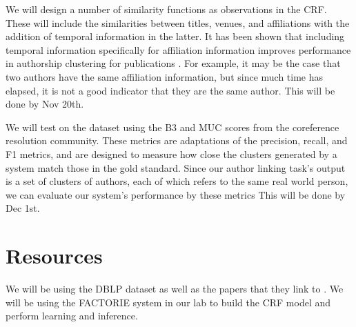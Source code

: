 \documentclass[]{article}
\begin{document}
We will design a number of similarity functions as observations in the CRF. These will include the similarities between titles, venues, and affiliations with the addition of temporal information in the latter. It has been shown that including temporal information specifically for affiliation information improves performance in authorship clustering for publications \cite{DBLP:journals/fcsc/LiDMS12}. For example, it may be the case that two authors have the same affiliation information, but since much time has elapsed, it is not a good indicator that they are the same author.
This will be done by Nov 20th.

We will test on the dataset using the B3 \cite{Bagga98algorithms} and MUC\cite{Vilain95} scores from the coreference resolution community.  These metrics are adaptations of the precision, recall, and F1 metrics, and are designed to measure how close the clusters generated by a system match those in the gold standard.  Since our author linking task's output is a set of clusters of authors, each of which refers to the same real world person, we can evaluate our system's performance by these metrics
This will be done by Dec 1st.

\section{Resources} %
\label{sec:resources}
We will be using the DBLP dataset as well as the papers that they link to \cite{ley2002dblp}. We will be using the FACTORIE system in our lab \cite{mccallum2009factorie} to build the CRF model and perform learning and inference.



\end{document}
